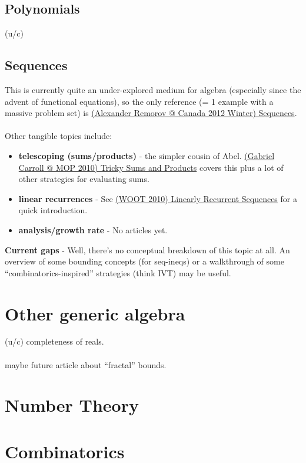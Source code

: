 \documentclass[a4paper]{article}
\begin{document}
	\subsection{Polynomials}
	(u/c)
	\subsection{Sequences}
	This is currently quite an under-explored medium for algebra (especially since the advent of functional equations), so the only reference (= 1 example with a massive problem set) is \href{run:./F_Algebra/(Alexander Remorov @ Canada 2012 Winter) Sequences.pdf}{(Alexander Remorov @ Canada 2012 Winter) Sequences}.\\\\
	Other tangible topics include:
	\begin{itemize}
	\item \textbf{telescoping (sums/products)} - the simpler cousin of Abel. \href{run:./F_Algebra/(Gabriel Carroll @ MOP 2010) Tricky Sums and Products.pdf}{(Gabriel Carroll @ MOP 2010) Tricky Sums and Products} covers this plus a lot of other strategies for evaluating sums.
	\item \textbf{linear recurrences} - See \href{run:./F_Algebra/(WOOT 2010) Linearly Recurrent Sequences.pdf}{(WOOT 2010) Linearly Recurrent Sequences} for a quick introduction.
	\item \textbf{analysis/growth rate} - No articles yet.
	\end{itemize}
	\textbf{Current gaps} - Well, there's no conceptual breakdown of this topic at all. An overview of some bounding concepts (for seq-ineqs) or a walkthrough of some ``combinatorics-inspired'' strategies (think IVT) may be useful.
	\section{Other generic algebra}
	(u/c) completeness of reals.\\\\
	maybe future article about ``fractal'' bounds.
%
	\section{Number Theory}
	\section{Combinatorics}
\end{document}
